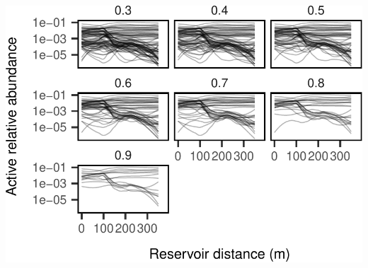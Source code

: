 \documentclass[]{article}
\begin{document}
\begin{center}\includegraphics{ReservoirGradient_files/figure-latex/unnamed-chunk-10-1} \end{center}
\end{document}

